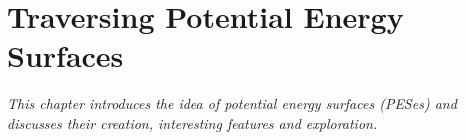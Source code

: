 \chapter{Traversing Potential Energy Surfaces}
\label{chap:pes}
\textit{This chapter introduces the idea of potential energy surfaces (PESes) and discusses their creation, interesting features and exploration.}









